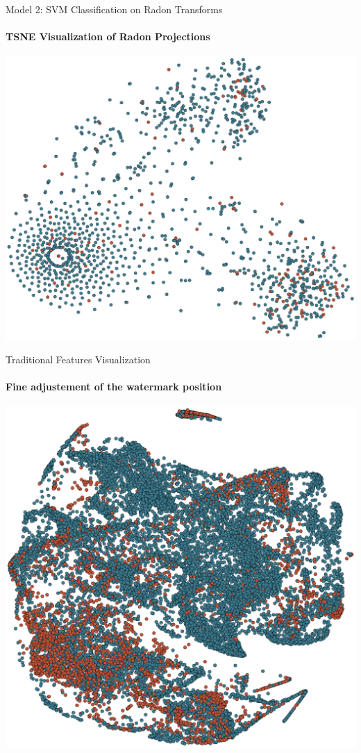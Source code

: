 \documentclass{beamer}
\begin{document}
\begin{frame}{Model 2: SVM Classification on Radon Transforms}
  \framesubtitle{TSNE Visualization of Radon Projections}

  \begin{center}
    \vspace*{-0.15cm}
  \includegraphics[scale=0.4]{img/tsne_Radon.eps}
  \end{center}

\end{frame}


\begin{frame}{Traditional Features Visualization}
  \framesubtitle{Fine adjustement of the watermark position}

  \begin{center}
    \vspace*{-0.15cm}
  \includegraphics[scale=0.35]{img/trad_feat_viz.eps}
  \end{center}

\end{frame}




\end{document}
